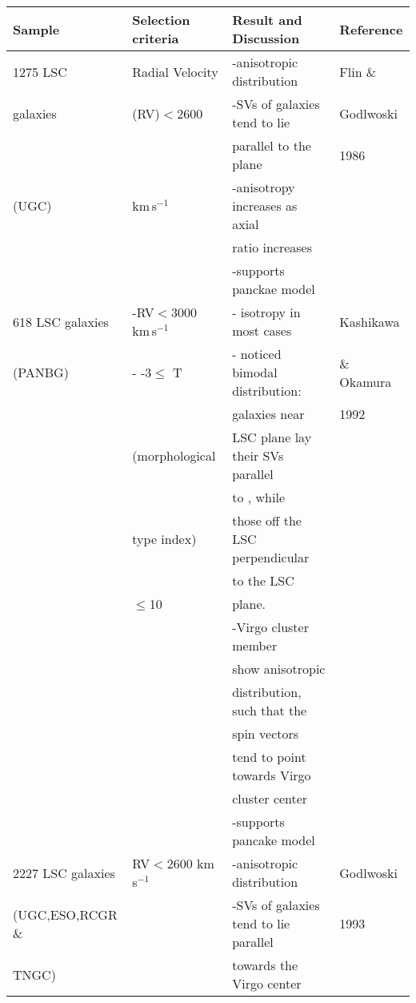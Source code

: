 \begin{center}
\begin{tabular}[lp=7cm]{|l|l|l|l|}%
\hline\hline
Sample		 		& Selection criteria 			& Result and Discussion 					& Reference\\
\hline
1275 LSC				&Radial Velocity					&-anisotropic distribution 				& Flin \&\\ 
galaxies 			&(RV)$<$2600 					& -SVs of galaxies tend to lie			&Godlwoski\\	 
					&								&parallel to the plane						&1986\\
(UGC)				&km\,s$^{-1}$					&-anisotropy increases as axial 			&\\
					&								&ratio increases							&\\
 					& 								&-supports panckae model							&\\
 \hline
 618 LSC galaxies	&-RV$<$3000 km\,s$^{-1}$			&- isotropy in most cases				&Kashikawa\\
 (PANBG)				&- -3$\leq$ T					&- noticed bimodal distribution:			&\& Okamura\\
 					&								& galaxies near							&1992\\
 					&(morphological					& LSC plane lay their SVs parallel 		&\\	
 					&								&to , while 									&\\
 					&type index)						&those off the LSC perpendicular			&\\
 					&								& to the LSC 							&\\
 					&$\leq$10						&plane.										&\\
 					&								&-Virgo cluster member 					&\\
 					&								&show anisotropic 						&\\
 					&								& distribution, such that the 			&\\
 					&								&spin vectors							&\\
 					&								&tend to point towards Virgo 			&\\
 					&								&cluster center							&\\
 					&								&-supports pancake model					&\\
 \hline
 2227 LSC galaxies	&RV$<$2600 km s$^{-1}$			&-anisotropic distribution				&Godlwoski\\
(UGC,ESO,RCGR \&		&								&-SVs of galaxies tend to lie parallel 	&1993\\
TNGC)				&								& towards the Virgo center				&\\

\end{tabular}
\end{center}
